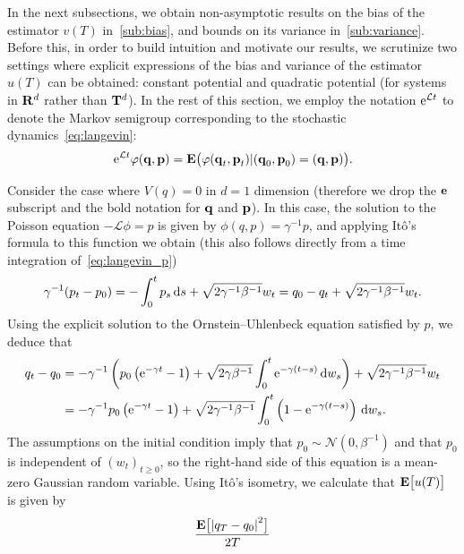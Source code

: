 \documentclass[11pt,a4paper]{article}
\begin{document}
In the next subsections,
we obtain non-asymptotic results on the bias of the estimator $v(T)$ in~\cref{sub:bias},
and bounds on its variance in~\cref{sub:variance}.
Before this,
in order to build intuition and motivate our results,
we scrutinize two settings where
explicit expressions of the bias and variance of the estimator $u(T)$ can be obtained:
constant potential and quadratic potential (for systems in $\mathbf R^d$ rather than $\mathbf T^d$).
In the rest of this section,
we employ the notation $\mathrm{e}^{\mathcal L t}$ to denote the Markov semigroup corresponding to the stochastic dynamics~\eqref{eq:langevin}:
\[
    \mathrm{e}^{\mathcal L t} \varphi(\boldsymbol{\mathbf q}, \boldsymbol{\mathbf p}) = \mathbf{E} \bigl(\varphi(\boldsymbol{\mathbf q}_t, \boldsymbol{\mathbf p}_t) | (\boldsymbol{\mathbf q}_0, \boldsymbol{\mathbf p}_0) = (\boldsymbol{\mathbf q}, \boldsymbol{\mathbf p})\bigr).
\]
\begin{example}
    \label{example:constant}
    Consider the case where $V(q) = 0$ in $d = 1$ dimension
    (therefore we drop the $\boldsymbol{\mathbf e}$ subscript and the bold notation for $\boldsymbol{\mathbf q}$ and $\boldsymbol{\mathbf p}$).
    In this case, the solution to the Poisson equation $- \mathcal L \phi = p$ is given by $\phi(q, p) = \gamma^{-1} p$,
    and applying Itô's formula to this function we obtain
    (this also follows directly from a time integration of~\eqref{eq:langevin_p})
    \[
        \gamma^{-1}(p_t - p_0) = - \int_{0}^{t} p_s \, \mathrm d s + \sqrt{2 \gamma^{-1} \beta^{-1}} w_t
        = q_0 - q_t + \sqrt{2 \gamma^{-1} \beta^{-1}} w_t.
    \]
    Using the explicit solution to the Ornstein--Uhlenbeck equation satisfied by $p$,
    we deduce that
    \begin{align*}
        q_t - q_0
        &= - \gamma^{-1} \left( p_0 \left(\mathrm{e}^{-\gamma t} - 1\right) + \sqrt{2 \gamma \beta^{-1}}\int_{0}^{t} \mathrm{e}^{-\gamma (t - s)} \, \mathrm d w_s \right)
        + \sqrt{2 \gamma^{-1} \beta^{-1}} w_t \\
        &=  - \gamma^{-1} p_0 \left(\mathrm{e}^{-\gamma t} - 1\right) + \sqrt{2 \gamma^{-1} \beta^{-1}}\int_{0}^{t} \left(1 - \mathrm{e}^{-\gamma (t - s)}\right) \, \mathrm d w_s.
    \end{align*}
    The assumptions on the initial condition imply that $p_0 \sim \mathcal N(0, \beta^{-1})$ and that $p_0$ is independent of $(w_t)_{t \geq 0}$,
    so the right-hand side of this equation is a mean-zero Gaussian random variable.
    Using It\^o's isometry, we calculate that $\mathbf{E} \bigl[ u(T) \bigr]$ is given by
    \begin{align*}
        \frac{\expect \bigl[\abs{q_T - q_0}^2\bigr]}{2T}

\end{align*}
\end{example}
\end{document}
